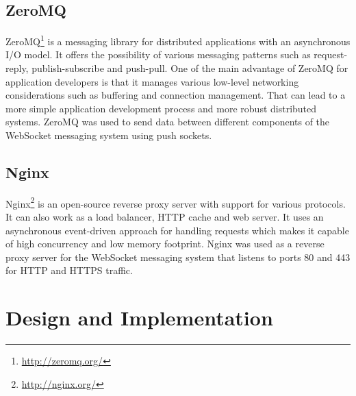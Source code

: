 \subsection{ZeroMQ}

ZeroMQ\footnote{\url{http://zeromq.org/}} is a messaging library for distributed applications with an asynchronous I/O model. It offers the possibility of various messaging patterns such as request-reply, publish-subscribe and push-pull. One of the main advantage of ZeroMQ for application developers is that it manages various low-level networking considerations such as buffering and connection management. That can lead to a more simple application development process and more robust distributed systems. ZeroMQ was used to send data between different components of the WebSocket messaging system using push sockets.

\subsection{Nginx}

Nginx\footnote{\url{http://nginx.org/}} is an open-source reverse proxy server with support for various protocols. It can also work as a load balancer, HTTP cache and web server. It uses an asynchronous event-driven approach for handling requests which makes it capable of high concurrency and low memory footprint. Nginx was used as a reverse proxy server for the WebSocket messaging system that listens to ports 80 and 443 for HTTP and HTTPS traffic.

\section{Design and Implementation}


